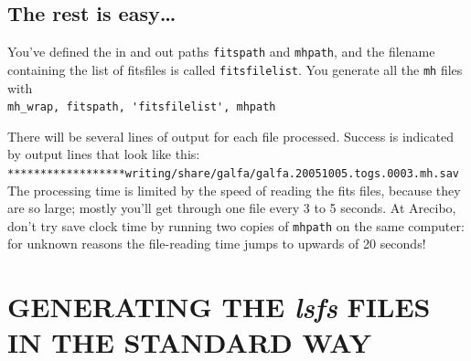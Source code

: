 \documentclass[psfig,preprint]{aastex}
\begin{document}
\subsection{The rest is easy\dots}

	You've defined the in and out paths \verb$fitspath$ and
\verb$mhpath$, and the filename containing the list of fitsfiles is
called \verb$fitsfilelist$. You generate all the \verb$mh$ files with \\
\verb$mh_wrap, fitspath, 'fitsfilelist', mhpath$

	There will be several lines of output for each file processed.
Success is indicated by output lines that look like this: \\
\verb$******************writing/share/galfa/galfa.20051005.togs.0003.mh.sav$ \\
The processing time is limited by the speed of reading the fits files,
because they are so large; mostly you'll get
through one file every 3 to 5 seconds. At Arecibo, don't try save clock time by
running two copies of \verb$mhpath$ on the same computer: for unknown
reasons the file-reading time jumps to upwards of 20 seconds!

\section{GENERATING THE {\it lsfs} FILES IN THE STANDARD WAY} \label{lsfsstd}
\end{document}
